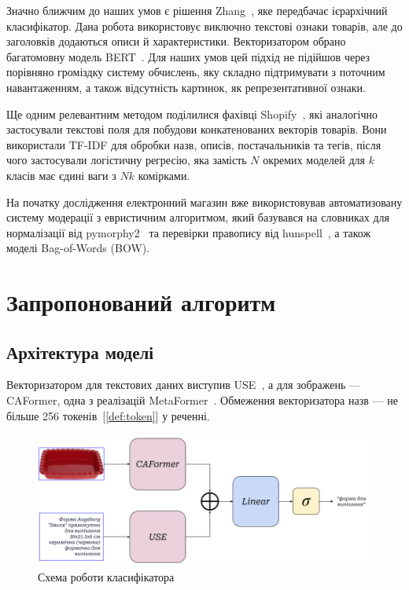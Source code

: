 \documentclass[fleqn,12pt,a4paper]{report}
\numberwithin{equation}{chapter}
\numberwithin{figure}{chapter}
\numberwithin{table}{chapter}
\numberwithin{footnote}{chapter}
\numberwithin{figure}{section}
\begin{document}
    Значно ближчим до наших умов є рішення Zhang~\cite{Zhang2021}, яке передбачає ієрархічний класифікатор.
    Дана робота використовує виключно текстові ознаки товарів, але до заголовків додаються описи й характеристики.
    Векторизатором обрано багатомовну модель BERT~\cite{devlin-etal-2019-bert}.
    Для наших умов цей підхід не підійшов через порівняно громіздку систему обчислень, яку складно підтримувати з
    поточним навантаженням, а також відсутність картинок, як репрезентативної ознаки.

    Ще одним релевантним методом поділилися фахівці Shopify~\cite{shopify2020}, які аналогічно застосували текстові
    поля для побудови конкатенованих векторів товарів.
    Вони використали TF-IDF для обробки назв, описів, постачальників та тегів, після чого застосували логістичну
    регресію, яка замість $N$ окремих моделей для $k$ класів має єдині ваги з $Nk$ комірками.

    На початку дослідження електронний магазин вже використовував автоматизовану систему модерації з евристичним
    алгоритмом, який базувався на словниках для нормалізації від pymorphy2~\cite{pymorphy2} та перевірки правопису від
    hunspell~\cite{hunspell}, а також моделі Bag-of-Words (BOW).

    \newpage


    \chapter{Запропонований алгоритм}\label{ch:chaper1}


    \section{Архітектура моделі}\label{sec:section1.1}

    Векторизатором для текстових даних виступив USE~\cite{yang-etal-2020-multilingual}, а для зображень --- \\
    CAFormer, одна з реалізацій MetaFormer~\cite{10304335}.
    Обмеження векторизатора назв --- не більше 256 токенів~[\ref{def:token}] у реченні.

    \noindent
    \begin{figure}[ht]
        \includegraphics[width=\textwidth]{images/catify-concatenated-model}
        \caption{Схема роботи класифікатора}
    \end{figure}
\end{document}
